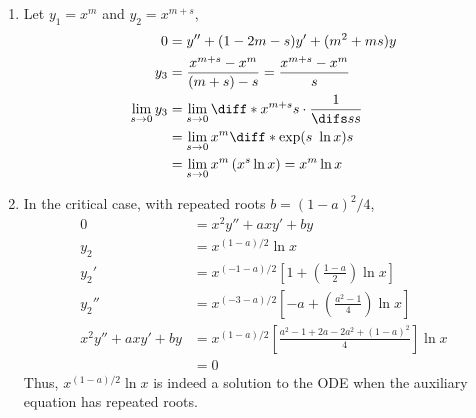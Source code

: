 \begin{enumerate}
\begin{enumerate}
              \item Let $ y_{1} = x^{m} $ and $ y_{2} = x^{m+s} $,
                    \begin{align}
                        0                           & = y'' + (1 -2m - s)y' + (m^{2} + ms)y                                 \\
                        y_{3}                       & = \frac{x^{m+s} - x^{m}}{(m+s) - s} = \frac{x^{m+s} - x^{m}}{s}       \\
                        \lim_{s \rightarrow 0}y_{3} & = \lim_{s \rightarrow 0} \diff*{x^{m+s}}{s} \cdot \frac{1}{\difs ss}  \\
                                                    & = \lim_{s \rightarrow 0} x^{m}\diff*{\exp(s\ \ln x)}{s}               \\
                                                    & = \lim_{s \rightarrow 0} x^{m}\left( x^{s} \ln x \right) = x^{m}\ln x
                    \end{align}

              \item In the critical case, with repeated roots $ b = (1-a)^{2}/4 $,
                    \begin{align}
                        0                    & = x^{2}y'' + axy' + by                                                            \\
                        y_{2}                & = x^{(1-a)/2}\ln x                                                                \\
                        y_{2}'               & = x^{(-1-a)/2} \left[ 1 + \left( \frac{1-a}{2} \right)\ln x \right]               \\
                        y_{2}''              & = x^{(-3-a)/2} \left[ -a + \left( \frac{a^{2} - 1}{4} \right) \ln x \right]       \\
                        x^{2}y'' + axy' + by & = x^{(1-a)/2} \left[  \frac{a^{2} - 1 + 2a - 2a^{2} + (1-a)^{2}}{4} \right] \ln x \\
                                             & = 0
                    \end{align}
                    Thus, $ x^{(1-a)/2}\ln x $ is indeed a solution to the ODE when the auxiliary equation has
                    repeated roots.


\end{enumerate}
\end{enumerate}
